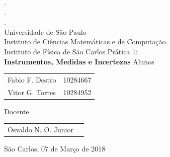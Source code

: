 \documentclass{article}
\begin{document}
\begin{titlepage}
\centering
{\Large
{\color{white}.\\.\\.} \\
Universidade de São Paulo\\
Instituto de Ciências Matemáticas e de Computação\\\vspace{1.8mm}
Instituto de Física de São Carlos}
\vfill
Prática 1:\\
{\Large\textbf{
Instrumentos, Medidas e Incertezas}}
\vfill
Alunos
\begin{tabular}{c c}
    Fabio F. Destro & 10284667\\
    Vitor G. Torres & 10284952
\end{tabular}
\vfill
Docente
\begin{tabular}{c c}
    Osvaldo N. O. Junior
\end{tabular}
\vfill
São Carlos, 07 de Março de 2018\\
\end{titlepage}
\end{document}
